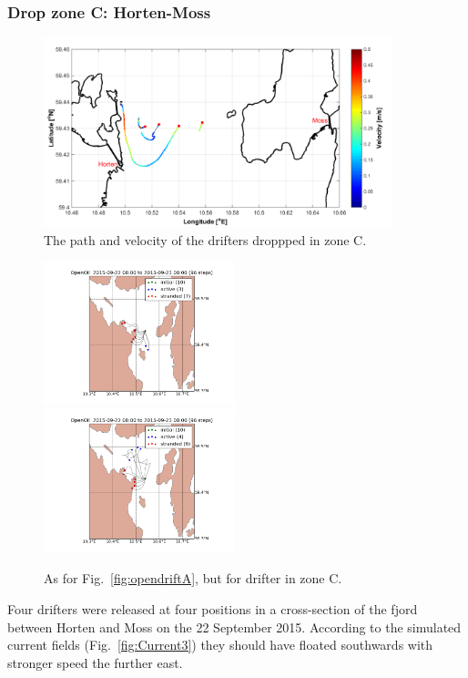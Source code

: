 \documentclass[12pt,a4paper,english]{article}
\begin{document}
\subsubsection{Drop zone C: Horten-Moss}
%
\begin{figure}[ht]
\centerline{
\includegraphics*[width=0.9\textwidth]{Figurer/zoneC}}
\caption{\small
The path and velocity of the drifters droppped in zone C.}
\label{fig:ZoneC}
\end{figure}
%
\begin{figure}[ht]
\centerline{
\includegraphics*[width=0.495\textwidth]{Opendrift_simulations/dropzone_C_no10_fjordos_arome}
\includegraphics*[width=0.495\textwidth]{Opendrift_simulations/dropzone_C_no10_norkyst_arome}
}
\caption{\small
As for Fig.~\ref{fig:opendriftA}, but for drifter in zone C.
}
\label{fig:opendriftC}
\end{figure}
%
Four drifters were released at four positions in a cross-section of the fjord between Horten and Moss on the 22 September 2015. According to the simulated current fields (Fig.~\ref{fig:Current3}) they should have floated southwards with stronger speed the further east. 
\end{document}

